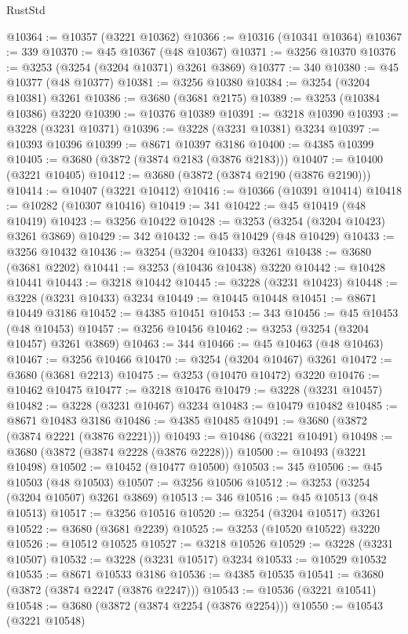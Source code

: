 \begin{lexlean}{RustStd}
\begin{coremodule}
@10364 := @10357 (@3221 @10362)
@10366 := @10316 (@10341 @10364)
@10367 := 339
@10370 := @45 @10367 (@48 @10367)
@10371 := @3256 @10370
@10376 := @3253 (@3254 (@3204 @10371) @3261 @3869)
@10377 := 340
@10380 := @45 @10377 (@48 @10377)
@10381 := @3256 @10380
@10384 := @3254 (@3204 @10381) @3261
@10386 := @3680 (@3681 @2175)
@10389 := @3253 (@10384 @10386) @3220
@10390 := @10376 @10389
@10391 := @3218 @10390
@10393 := @3228 (@3231 @10371)
@10396 := @3228 (@3231 @10381) @3234
@10397 := @10393 @10396
@10399 := @8671 @10397 @3186
@10400 := @4385 @10399
@10405 := @3680 (@3872 (@3874 @2183 (@3876 @2183)))
@10407 := @10400 (@3221 @10405)
@10412 := @3680 (@3872 (@3874 @2190 (@3876 @2190)))
@10414 := @10407 (@3221 @10412)
@10416 := @10366 (@10391 @10414)
@10418 := @10282 (@10307 @10416)
@10419 := 341
@10422 := @45 @10419 (@48 @10419)
@10423 := @3256 @10422
@10428 := @3253 (@3254 (@3204 @10423) @3261 @3869)
@10429 := 342
@10432 := @45 @10429 (@48 @10429)
@10433 := @3256 @10432
@10436 := @3254 (@3204 @10433) @3261
@10438 := @3680 (@3681 @2202)
@10441 := @3253 (@10436 @10438) @3220
@10442 := @10428 @10441
@10443 := @3218 @10442
@10445 := @3228 (@3231 @10423)
@10448 := @3228 (@3231 @10433) @3234
@10449 := @10445 @10448
@10451 := @8671 @10449 @3186
@10452 := @4385 @10451
@10453 := 343
@10456 := @45 @10453 (@48 @10453)
@10457 := @3256 @10456
@10462 := @3253 (@3254 (@3204 @10457) @3261 @3869)
@10463 := 344
@10466 := @45 @10463 (@48 @10463)
@10467 := @3256 @10466
@10470 := @3254 (@3204 @10467) @3261
@10472 := @3680 (@3681 @2213)
@10475 := @3253 (@10470 @10472) @3220
@10476 := @10462 @10475
@10477 := @3218 @10476
@10479 := @3228 (@3231 @10457)
@10482 := @3228 (@3231 @10467) @3234
@10483 := @10479 @10482
@10485 := @8671 @10483 @3186
@10486 := @4385 @10485
@10491 := @3680 (@3872 (@3874 @2221 (@3876 @2221)))
@10493 := @10486 (@3221 @10491)
@10498 := @3680 (@3872 (@3874 @2228 (@3876 @2228)))
@10500 := @10493 (@3221 @10498)
@10502 := @10452 (@10477 @10500)
@10503 := 345
@10506 := @45 @10503 (@48 @10503)
@10507 := @3256 @10506
@10512 := @3253 (@3254 (@3204 @10507) @3261 @3869)
@10513 := 346
@10516 := @45 @10513 (@48 @10513)
@10517 := @3256 @10516
@10520 := @3254 (@3204 @10517) @3261
@10522 := @3680 (@3681 @2239)
@10525 := @3253 (@10520 @10522) @3220
@10526 := @10512 @10525
@10527 := @3218 @10526
@10529 := @3228 (@3231 @10507)
@10532 := @3228 (@3231 @10517) @3234
@10533 := @10529 @10532
@10535 := @8671 @10533 @3186
@10536 := @4385 @10535
@10541 := @3680 (@3872 (@3874 @2247 (@3876 @2247)))
@10543 := @10536 (@3221 @10541)
@10548 := @3680 (@3872 (@3874 @2254 (@3876 @2254)))
@10550 := @10543 (@3221 @10548)

\end{coremodule}
\end{lexlean}
